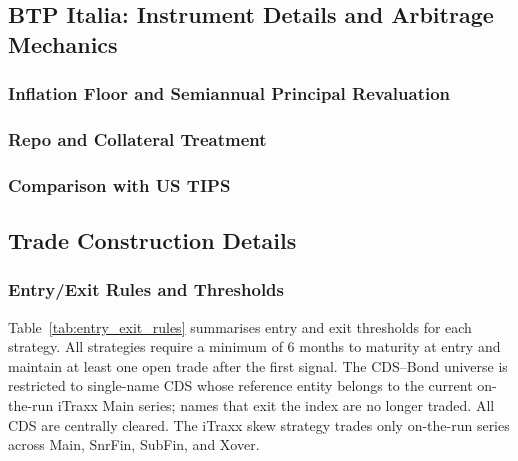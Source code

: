 

\subsection{BTP Italia: Instrument Details and Arbitrage Mechanics}
\label{app:btp_details}

\subsubsection{Inflation Floor and Semiannual Principal Revaluation}
\label{app:btp_floor}

\subsubsection{Repo and Collateral Treatment}
\label{app:btp_repo}

\subsubsection{Comparison with US TIPS}
\label{app:btp_vs_tips}


\subsection{Trade Construction Details}
\label{app:trade_details}

\subsubsection{Entry/Exit Rules and Thresholds}
\label{app:entry_exit}
Table~\ref{tab:entry_exit_rules} summarises entry and exit thresholds
for each strategy. All strategies require a minimum of 6 months to
maturity at entry and maintain at least one open trade after the first
signal. The CDS--Bond universe is restricted to single-name CDS whose
reference entity belongs to the current on-the-run iTraxx Main series;
names that exit the index are no longer traded. All CDS are centrally
cleared. The iTraxx skew strategy trades only on-the-run series across
Main, SnrFin, SubFin, and Xover.


